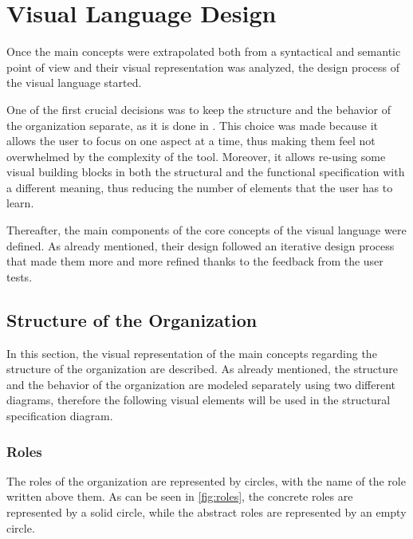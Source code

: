 \section{Visual Language Design}
Once the main concepts were extrapolated both from a syntactical and semantic point of view and their visual representation was analyzed, the design process of the visual language started.

One of the first crucial decisions was to keep the structure and the behavior of the organization separate, as it is done in \moise{}.
This choice was made because it allows the user to focus on one aspect at a time, thus making them feel not overwhelmed by the complexity of the tool.
Moreover, it allows re-using some visual building blocks in both the structural and the functional specification with a different meaning, thus reducing the number of elements that the user has to learn.

Thereafter, the main components of the core concepts of the visual language were defined.
As already mentioned, their design followed an iterative design process that made them more and more refined thanks to the feedback from the user tests.

\subsection{Structure of the Organization}
In this section, the visual representation of the main concepts regarding the structure of the organization are described.
As already mentioned, the structure and the behavior of the organization are modeled separately using two different diagrams, therefore the following visual elements will be used in the structural specification diagram.

\subsubsection{Roles}
The roles of the organization are represented by circles, with the name of the role written above them.
As can be seen in \cref{fig:roles}, the concrete roles are represented by a solid circle, while the abstract roles are represented by an empty circle.

